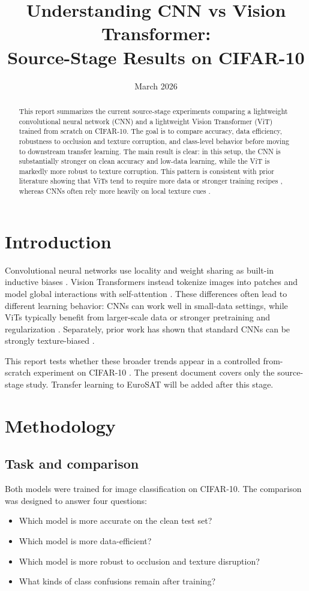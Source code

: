 \documentclass[11pt]{article}
\title{Understanding CNN vs Vision Transformer:\\
Source-Stage Results on CIFAR-10}
\author{}
\date{March 2026}
\begin{document}
\maketitle

\begin{abstract}
This report summarizes the current source-stage experiments comparing a lightweight convolutional neural network (CNN) and a lightweight Vision Transformer (ViT) trained from scratch on CIFAR-10. The goal is to compare accuracy, data efficiency, robustness to occlusion and texture corruption, and class-level behavior before moving to downstream transfer learning. The main result is clear: in this setup, the CNN is substantially stronger on clean accuracy and low-data learning, while the ViT is markedly more robust to texture corruption. This pattern is consistent with prior literature showing that ViTs tend to require more data or stronger training recipes \cite{dosovitskiy2021image,touvron2021training}, whereas CNNs often rely more heavily on local texture cues \cite{geirhos2019imagenet}.
\end{abstract}

\section{Introduction}
Convolutional neural networks use locality and weight sharing as built-in inductive biases \cite{lecun1998gradient}. Vision Transformers instead tokenize images into patches and model global interactions with self-attention \cite{dosovitskiy2021image}. These differences often lead to different learning behavior: CNNs can work well in small-data settings, while ViTs typically benefit from larger-scale data or stronger pretraining and regularization \cite{dosovitskiy2021image,touvron2021training}. Separately, prior work has shown that standard CNNs can be strongly texture-biased \cite{geirhos2019imagenet}.

This report tests whether these broader trends appear in a controlled from-scratch experiment on CIFAR-10 \cite{krizhevsky2009learning}. The present document covers only the source-stage study. Transfer learning to EuroSAT will be added after this stage.

\section{Methodology}
\subsection{Task and comparison}
Both models were trained for image classification on CIFAR-10. The comparison was designed to answer four questions:
\begin{itemize}
    \item Which model is more accurate on the clean test set?
    \item Which model is more data-efficient?
    \item Which model is more robust to occlusion and texture disruption?
    \item What kinds of class confusions remain after training?
\end{itemize}
\end{document}
